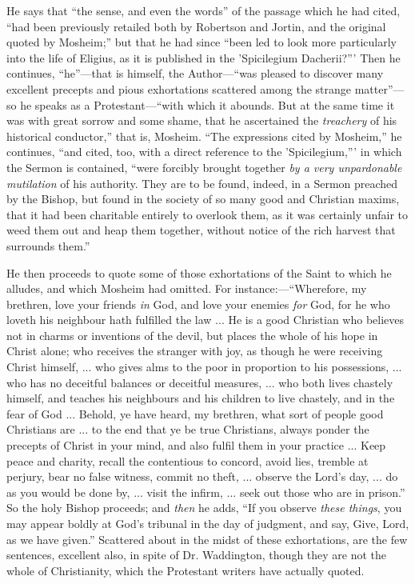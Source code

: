 He says that ``the sense, and even the words''
of the passage which he had cited, ``had been
previously retailed both by Robertson and Jortin, and the
original quoted by Mosheim;'' but that he had since
``been led to look more particularly into the life of
Eligius, as it is published in the 'Spicilegium
Dacherii?''' Then he continues,
``he''—that is himself, the
Author—``was pleased to discover many excellent
precepts and pious exhortations scattered among the
strange matter''—so he speaks as a
Protestant—``with which it abounds. But at the
same time it was with great sorrow and some shame, that
he ascertained the \emph{treachery} of his historical
conductor,'' that is, Mosheim. ``The expressions
cited by Mosheim,'' he continues, ``and cited,
too, with a direct reference to the 'Spicilegium,'''
in which the Sermon is contained, ``were forcibly
brought together \emph{by a very unpardonable mutilation}
of his authority. They are to be found, indeed, in a
Sermon preached by the Bishop, but found in the society
of so many good and Christian maxims, that it had been
charitable entirely to overlook them, as it was certainly
unfair to weed them out and heap them together, without
notice of the rich harvest that surrounds them.''

He then proceeds to quote some of those exhortations
of the Saint to which he alludes, and which Mosheim had
omitted. For instance:—``Wherefore, my brethren,
love your friends \emph{in} God, and love your enemies \emph{for}
God, for he who loveth his neighbour hath fulfilled the
law ... He is a good Christian who believes not in charms
or inventions of the devil, but places the whole of his
hope in Christ alone; who receives the stranger with joy,
as though he were receiving Christ himself, ... who gives
alms to the poor in proportion to his possessions, ...
who has no deceitful balances or deceitful measures, ...
who both lives chastely himself, and teaches his
neighbours and his children to live chastely, and in the
fear of God ... Behold, ye have heard, my brethren, what
sort of people good Christians are ... to the end that ye
be true Christians, always ponder the precepts of Christ
in your mind, and also fulfil them in your practice ...
Keep peace and charity, recall the contentious to
concord, avoid lies, tremble at perjury, bear no false
witness, commit no theft, ... observe the Lord's day, ...
do as you would be done by, ... visit the infirm, ...
seek out those who are in prison.'' So the holy
Bishop proceeds; and \emph{then} he adds, ``If you
observe \emph{these things}, you may appear boldly at
God's tribunal in the day of judgment, and say, Give,
Lord, as we have given.'' Scattered about in the
midst of these exhortations, are the few sentences,
excellent also, in spite of Dr. Waddington, though they
are not the whole of Christianity, which the Protestant
writers have actually quoted.

